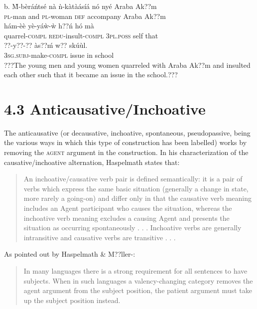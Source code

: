 \documentclass[output=paper]{langsci/langscibook}
\begin{document}
\gll  b.  \`{M}-b\`{e}r\'{a}\'{n}ts\'{e}  n\`{a}  \`{n}-k\`{a}t\`{a}\'{a}s\'{i}\'{a}  n\'{o}   ny\'{e}     Araba Ak??m  \\
       \textsc{pl}{}-man    and  \textsc{pl}{}-woman  \textsc{def}  accompany  Araba Ak??m\\
\gll   h\'{a}m-\`{e}\`{e}      y\`{e}-y\'{a}\`{w}-\`{w}    h??\'{n}    h\'{o}  m\`{a}\\
       quarrel-\textsc{compl}    \textsc{redu}{}-insult-\textsc{compl}  \textsc{3pl.poss}  self  that\\
\gll   ??{}-y??-??        \`{a}s??\'{m}  w??  sk\'{u}\`{u}l.\\
       \textsc{3sg.subj}{}-make-\textsc{compl}  issue  in  school\\
\glt ???The young men and young women quarreled with Araba Ak??m and insulted each other such that it became an issue in the school.??? \citep[21]{Martin1936}  
\z

\section{4.3  Anticausative/Inchoative}

The anticausative (or decausative, inchoative, spontaneous, pseudopassive, being the various ways in which this type of construction has been labelled) works by removing the \textsc{agent} argument in the construction. In his characterization of the causative/inchoative alternation, Haspelmath states that:

\begin{quote}
An inchoative/causative verb pair is defined semantically: it is a pair of verbs which express the same basic situation (generally a change in state, more rarely a going-on) and differ only in that the causative verb meaning includes an Agent participant who causes the situation, whereas the inchoative verb meaning excludes a causing Agent and presents the situation as occurring spontaneously . . . Inchoative verbs are generally intransitive and causative verbs are transitive . . . \citep[90]{Haspelmath1993}
\end{quote}

As pointed out by Haspelmath \& M??ller-\citet[1132]{Bardey2004}: 

\begin{quote}
In many languages there is a strong requirement for all sentences to have subjects. When in such languages a valency-changing category removes the agent argument from the subject position, the patient argument must take up the subject position instead.
\end{quote}
\end{document}
